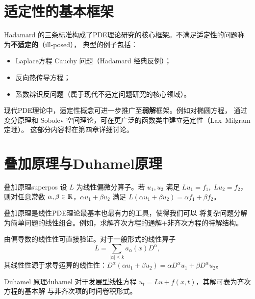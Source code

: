 \documentclass[11pt,a4paper,openany,oneside]{ctexbook}
\begin{document}
\section{适定性的基本框架}

Hadamard 的三条标准构成了PDE理论研究的核心框架。不满足适定性的问题称为\textbf{不适定的}（ill-posed），
典型的例子包括：

\begin{itemize}
  \item Laplace方程 Cauchy 问题（Hadamard 经典反例）；
  \item 反向热传导方程；
  \item 系数辨识反问题（属于现代不适定问题研究的核心领域）。
\end{itemize}

\begin{remarkbox}
  现代PDE理论中，适定性概念可进一步推广至\textbf{弱解}框架。例如对椭圆方程，
  通过变分原理和 Sobolev 空间理论，可在更广泛的函数类中建立适定性（Lax--Milgram 定理）。
  这部分内容将在第四章详细讨论。
\end{remarkbox}

\section{叠加原理与Duhamel原理}

\begin{theorem}{叠加原理}{superpos}
  设 $L$ 为线性偏微分算子。若 $u_{1},u_{2}$ 满足 $Lu_{1}=f_{1},\;Lu_{2}=f_{2}$，
  则对任意常数 $\alpha,\beta\in\mathbb{R}$，$\alpha u_{1}+\beta u_{2}$ 满足
  $L(\alpha u_{1}+\beta u_{2}) = \alpha f_{1}+\beta f_{2}$。
\end{theorem}

叠加原理是线性PDE理论最基本也最有力的工具，使得我们可以
将复杂问题分解为简单问题的线性组合。例如，求解齐次方程的通解+非齐次方程的特解结构。

\begin{proofbox}
  由偏导数的线性性可直接验证。对于一般形式的线性算子
  $$
  L = \sum_{|\alpha|\le k} a_{\alpha}(x)D^{\alpha},
  $$
  其线性性源于求导运算的线性性：$D^{\alpha}(\alpha u_{1}+\beta u_{2})
  = \alpha D^{\alpha}u_{1} + \beta D^{\alpha}u_{2}$。
\end{proofbox}

\begin{proposition}{Duhamel 原理}{duhamel}
  对于发展型线性方程 $u_{t} = Lu + f(x,t)$，其解可表为齐次方程的基本解
  与非齐次项的时间卷积形式。
\end{proposition}
\end{document}
